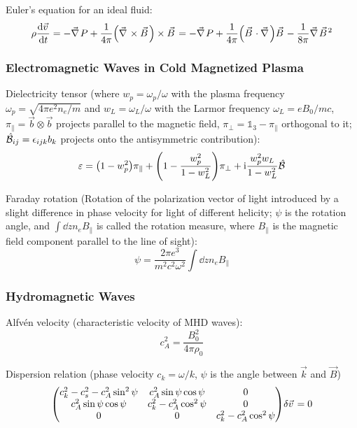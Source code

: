 			\noindent
			Euler's equation for an ideal fluid:
			\begin{equation}
				\rho \dv{\vec{v}}{t} = - \Nabla P + \frac{1}{4\pi}\qty(\Nabla\times\vec{B})\times\vec{B}
				= - \Nabla P + \frac{1}{4\pi} \qty(\vec{B} \cdot \Nabla) \vec{B} - \frac{1}{8\pi} \Nabla \vec{B}^2
			\end{equation}

		\subsubsection{Electromagnetic Waves in Cold Magnetized Plasma}
			Dielectricity tensor (where $w_p = \omega_p / \omega$ with the plasma frequency $\omega_p = \sqrt{4\pi e^2 n_e/m}$ and $w_L = \omega_L / \omega$ with the Larmor frequency $\omega_L = e B_0/mc$, $\pi_\parallel = \vec{b}\otimes\vec{b}$ projects parallel to the magnetic field, $\pi_\perp = \mathds{1}_3 - \pi_\parallel$ orthogonal to it; $\hat{\mathcal{B}}_{ij} = \epsilon_{ijk} b_k$ projects onto the antisymmetric contribution):
			\begin{equation}
				\varepsilon = \qty(1 - w_p^2) \pi_\parallel + \qty(1-\frac{w_p^2}{1-w_L^2})\pi_\perp + \mathrm{i} \frac{w_p^2 w_L}{1-w_L^2} \hat{\mathcal{B}}
			\end{equation}

			\noindent
			Faraday rotation (Rotation of the polarization vector of light introduced by a slight difference in phase velocity for light of different helicity; $\psi$ is the rotation angle, and $\int \dd{z} n_e B_\parallel$ is called the rotation measure, where $B_\parallel$ is the magnetic field component parallel to the line of sight):
			\begin{equation}
				\psi = \frac{2\pi e^3}{m^2 c^2 \omega^2} \int \dd{z} n_e B_\parallel
			\end{equation}

		\subsubsection{Hydromagnetic Waves}
			Alfvén velocity (characteristic velocity of MHD waves):
			\begin{equation}
				c_A^2 = \frac{B_0^2}{4\pi \rho_0}
			\end{equation}

			\noindent
			Dispersion relation (phase velocity $c_k = \omega/k$, $\psi$ is the angle between $\vec{k}$ and $\vec{B}$)
			\begin{equation}
				\mqty(
				c_k^2 - c_s^2 - c_A^2 \sin^2 \psi & c_A^2 \sin\psi \cos\psi & 0 \\
				c_A^2 \sin\psi \cos\psi & c_k^2 - c_A^2 \cos^2 \psi & 0 \\
				0 & 0 & c_k^2 - c_A^2 \cos^2 \psi
				) \delta \vec{v} = 0
			\end{equation}

